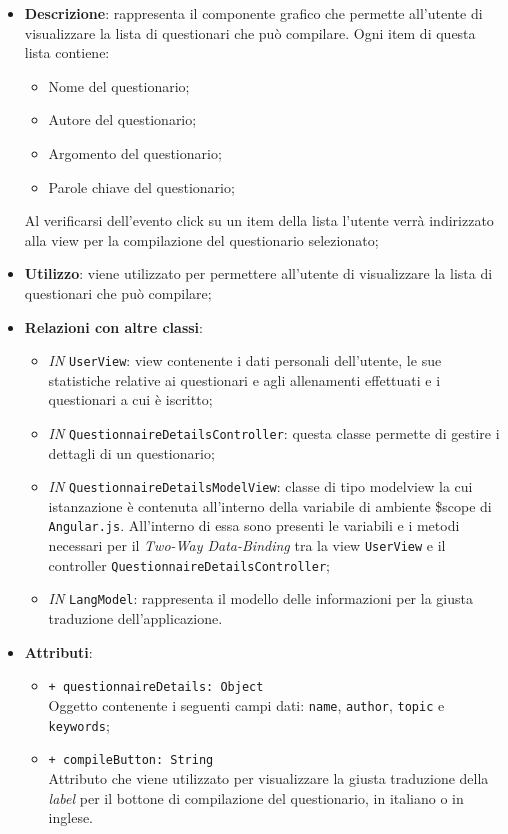 \begin{itemize}
	\item \textbf{Descrizione}: rappresenta il componente grafico che permette all'utente di visualizzare la lista di questionari che può compilare. Ogni item di questa lista contiene:
		\begin{itemize}
			\item Nome del questionario;
			\item Autore del questionario;
			\item Argomento del questionario;
			\item Parole chiave del questionario;
		\end{itemize}
	Al verificarsi dell'evento click su un item della lista l'utente verrà indirizzato alla view per la compilazione del questionario selezionato;
	\item \textbf{Utilizzo}: viene utilizzato per permettere all'utente di visualizzare la lista di questionari che può compilare;
	\item \textbf{Relazioni con altre classi}: 
	\begin{itemize}
		\item \textit{IN} \texttt{UserView}: view contenente i dati personali dell'utente, le sue statistiche relative ai questionari e agli allenamenti effettuati e i questionari a cui è iscritto;
		\item \textit{IN} \texttt{QuestionnaireDetailsController}: questa classe permette di gestire i dettagli di un questionario;
		\item \textit{IN} \texttt{QuestionnaireDetailsModelView}: classe di tipo modelview la cui istanzazione è contenuta all'interno della variabile di ambiente \$scope di \texttt{Angular.js}. All'interno di essa sono presenti le variabili e i metodi necessari per il \textit{Two-Way Data-Binding} tra la view \texttt{UserView} e il controller \texttt{QuestionnaireDetailsController};
		\item \textit{IN} \texttt{LangModel}: rappresenta il modello delle informazioni per la giusta traduzione dell'applicazione. 
	\end{itemize}
	\item \textbf{Attributi}: 
	\begin{itemize}
		\item \texttt{+ questionnaireDetails: Object} \\ Oggetto contenente i seguenti campi dati: \texttt{name}, \texttt{author}, \texttt{topic} e \texttt{keywords};
		\item \texttt{+ compileButton: String} \\ Attributo che viene utilizzato per visualizzare la giusta traduzione della \textit{label} per il bottone di compilazione del questionario, in italiano o in inglese.
	\end{itemize}
\end{itemize}

